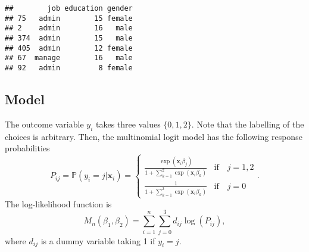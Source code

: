 \documentclass[
  12pt,
]{article}
\newenvironment{Shaded}{\begin{snugshade}}{\end{snugshade}}
\newcommand{\DataTypeTok}[1]{\textcolor[rgb]{0.13,0.29,0.53}{#1}}
\newcommand{\DecValTok}[1]{\textcolor[rgb]{0.00,0.00,0.81}{#1}}
\newcommand{\KeywordTok}[1]{\textcolor[rgb]{0.13,0.29,0.53}{\textbf{#1}}}
\newcommand{\NormalTok}[1]{#1}
\newcommand{\OperatorTok}[1]{\textcolor[rgb]{0.81,0.36,0.00}{\textbf{#1}}}
\newcommand{\OtherTok}[1]{\textcolor[rgb]{0.56,0.35,0.01}{#1}}
\newcommand{\StringTok}[1]{\textcolor[rgb]{0.31,0.60,0.02}{#1}}
\begin{document}
\begin{Shaded}
\end{Shaded}

\begin{verbatim}
##        job education gender
## 75   admin        15 female
## 2    admin        16   male
## 374  admin        15   male
## 405  admin        12 female
## 67  manage        16   male
## 92   admin         8 female
\end{verbatim}

\hypertarget{model-1}{%
\subsection{Model}\label{model-1}}

The outcome variable \(y_i\) takes three values \(\{0, 1, 2\}\). Note
that the labelling of the choices is arbitrary. Then, the multinomial
logit model has the following response probabilities \begin{equation*}
  P_{ij} = \mathbb{P}(y_i = j | \mathbf{x}_i) =
  \begin{cases}
    \frac{\exp(\mathbf{x}_i \beta_j)}{1 + \sum_{k=1}^2 \exp(\mathbf{x}_i \beta_k)} &\text{if}\quad j = 1, 2  \\
    \frac{1}{1 + \sum_{k=1}^2 \exp(\mathbf{x}_i \beta_k)}  &\text{if}\quad j = 0
  \end{cases}.
\end{equation*} The log-likelihood function is \begin{equation*}
  M_n(\beta_1, \beta_2) = \sum_{i=1}^n \sum_{j=0}^3 d_{ij} \log (P_{ij}),
\end{equation*} where \(d_{ij}\) is a dummy variable taking 1 if
\(y_i = j\).
\end{document}
